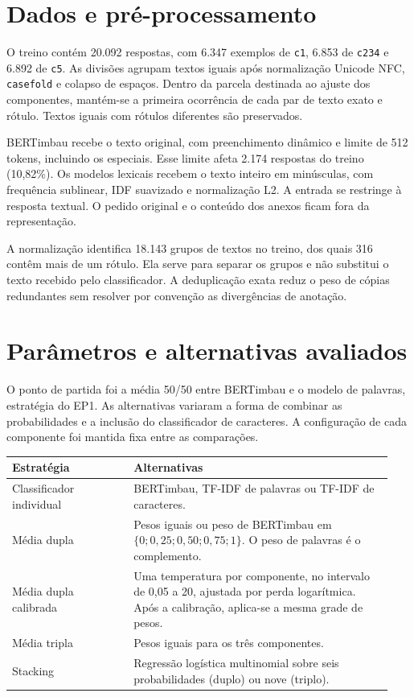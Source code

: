 \documentclass[11pt,a4paper]{article}
\begin{document}
\section{Dados e pré-processamento}

O treino contém 20.092 respostas, com 6.347 exemplos de \nolinkurl{c1}, 6.853 de \nolinkurl{c234} e 6.892 de \nolinkurl{c5}. As divisões agrupam textos iguais após normalização Unicode NFC, \nolinkurl{casefold} e colapso de espaços. Dentro da parcela destinada ao ajuste dos componentes, mantém-se a primeira ocorrência de cada par de texto exato e rótulo. Textos iguais com rótulos diferentes são preservados.

BERTimbau recebe o texto original, com preenchimento dinâmico e limite de 512 tokens, incluindo os especiais. Esse limite afeta 2.174 respostas do treino (10,82\%). Os modelos lexicais recebem o texto inteiro em minúsculas, com frequência sublinear, IDF suavizado e normalização L2. A entrada se restringe à resposta textual. O pedido original e o conteúdo dos anexos ficam fora da representação.

A normalização identifica 18.143 grupos de textos no treino, dos quais 316 contêm mais de um rótulo. Ela serve para separar os grupos e não substitui o texto recebido pelo classificador. A deduplicação exata reduz o peso de cópias redundantes sem resolver por convenção as divergências de anotação.

\clearpage
\section{Parâmetros e alternativas avaliados}

O ponto de partida foi a média 50/50 entre BERTimbau e o modelo de palavras, estratégia do EP1. As alternativas variaram a forma de combinar as probabilidades e a inclusão do classificador de caracteres. A configuração de cada componente foi mantida fixa entre as comparações.

\begingroup\small
\begin{longtable}{@{}p{0.30\linewidth}p{0.64\linewidth}@{}}
\toprule
\textbf{Estratégia} & \textbf{Alternativas}\\
\midrule
Classificador individual & BERTimbau, TF-IDF de palavras ou TF-IDF de caracteres.\\
Média dupla & Pesos iguais ou peso de BERTimbau em $\{0;0{,}25;0{,}50;0{,}75;1\}$. O peso de palavras é o complemento.\\
Média dupla calibrada & Uma temperatura por componente, no intervalo de 0,05 a 20, ajustada por perda logarítmica. Após a calibração, aplica-se a mesma grade de pesos.\\
Média tripla & Pesos iguais para os três componentes.\\
Stacking & Regressão logística multinomial sobre seis probabilidades (duplo) ou nove (triplo).\\
\bottomrule
\end{longtable}
\endgroup
\end{document}
